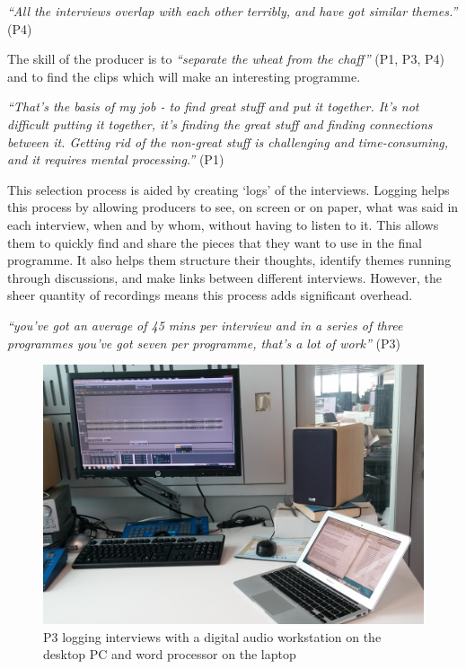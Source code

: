 \textit{``All the interviews overlap with each other terribly, and have got similar themes.''} (P4)

The skill of the producer is to \textit{``separate the wheat from the chaff''} (P1, P3, P4) and to find the clips which
will make an interesting programme.

\textit{``That's the basis of my job - to find great stuff and put it together.  It's not difficult putting it
  together, it's finding the great stuff and finding connections between it. Getting rid of the non-great stuff is
  challenging and time-consuming, and it requires mental processing.''} (P1)

This selection process is aided by creating `logs' of the interviews.  Logging helps this process by allowing producers
to see, on screen or on paper, what was said in each interview, when and by whom, without having to listen to it.  This
allows them to quickly find and share the pieces that they want to use in the final programme.  It also helps them
structure their thoughts, identify themes running through discussions, and make links between different interviews.
However, the sheer quantity of recordings means this process adds significant overhead.

\textit{``you've got an average of 45 mins per interview and in a series of three programmes you've got seven per
  programme, that's a lot of work''} (P3)

\begin{figure}[ht]
\centering
  \includegraphics[width=\columnwidth]{figs/phil-desk.jpg}
  \caption{P3 logging interviews with a digital audio workstation on the desktop
    PC and word processor on the laptop}
  \label{fig:desk}
\end{figure}

